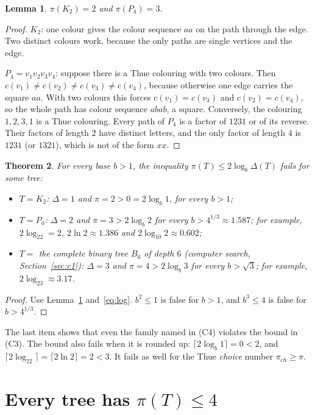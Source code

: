 \documentclass[11pt]{article}
\newtheorem{theorem}{Theorem}
\newtheorem{lemma}[theorem]{Lemma}
\theoremstyle{definition}
\theoremstyle{remark}
\begin{document}
\begin{lemma}\label{lem:small}
$\pi(K_2)=2$ and $\pi(P_4)=3$.
\end{lemma}

\begin{proof}
$K_2$: one colour gives the colour sequence $aa$ on the path through the edge. Two distinct
colours work, because the only paths are single vertices and the edge.

$P_4=v_1v_2v_3v_4$: suppose there is a Thue colouring with two colours. Then
$c(v_1)\ne c(v_2)\ne c(v_3)\ne c(v_4)$, because otherwise one edge carries the square $aa$. With
two colours this forces $c(v_1)=c(v_3)$ and $c(v_2)=c(v_4)$, so the whole path has colour sequence
$abab$, a square. Conversely, the colouring $1,2,3,1$ is a Thue colouring. Every path of $P_4$ is
a factor of $1231$ or of its reverse. Their factors of length $2$ have distinct letters, and the
only factor of length $4$ is $1231$ (or $1321$), which is not of the form $xx$.
\end{proof}

\begin{theorem}\label{thm:c3}
For every base $b>1$, the inequality $\pi(T)\le2\log_b\Delta(T)$ fails for some tree:
\begin{itemize}
\item $T=K_2$: $\Delta=1$ and $\pi=2>0=2\log_b1$, for every $b>1$;
\item $T=P_4$: $\Delta=2$ and $\pi=3>2\log_b2$ for every $b>4^{1/3}\approx1.587$; for example,
$2\log_22=2$, $2\ln2\approx1.386$ and $2\log_{10}2\approx0.602$;
\item $T=$ the complete binary tree $B_6$ of depth $6$ (computer search,
Section~\ref{sec:c1}): $\Delta=3$ and $\pi=4>2\log_b3$ for every $b>\sqrt3$; for example,
$2\log_23\approx3.17$.
\end{itemize}
\end{theorem}

\begin{proof}
Use Lemma~\ref{lem:small} and~\eqref{eq:log}. $b^2\le1$ is false for $b>1$, and $b^3\le4$ is
false for $b>4^{1/3}$.
\end{proof}

The last item shows that even the family named in (C4) violates the bound in (C3). The bound
also fails when it is rounded up: $\lceil 2\log_b1\rceil=0<2$, and $\lceil2\log_22\rceil=
\lceil2\ln2\rceil=2<3$. It fails as well for the Thue \emph{choice} number $\pi_{ch}\ge\pi$.

\section{\texorpdfstring{Every tree has $\pi(T)\le4$}{Every tree has pi(T) <= 4}}\label{sec:four}
\end{document}
